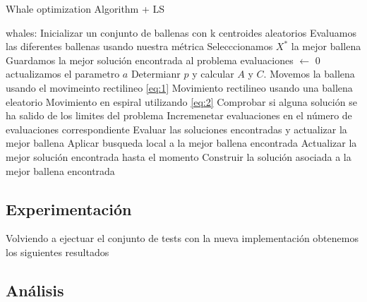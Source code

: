 \documentclass[11pt]{article}
\begin{document}
\begin{algorithm}[H]
  \caption{Whale optimization Algorithm + LS}
  \label{alg-lsearch}
  \begin{algorithmic}[1]
    \State whales: Inicializar un conjunto de ballenas con k centroides aleatorios
    \State Evaluamos las diferentes ballenas usando nuestra métrica 
    \State Selecccionamos $X^*$ la mejor ballena
    \State Guardamos la mejor solución encontrada al problema
    \State evaluaciones $\leftarrow$ 0
    \State actualizamos el parametro $a$
    \State Determianr $p$ y calcular  $A$ y $C$.
    \State Movemos la ballena usando el movimeinto rectilineo \eqref{eq:1}
    \State Movimiento rectilineo usando una ballena eleatorio
    \EndIf
    \Else
    \State Movimiento en espiral utilizando \eqref{eq:2}
    \EndIf
    \EndFor 
    \State Comprobar si alguna solución se ha salido de los limites del problema
    \State Incremenetar evaluaciones en el número de evaluaciones correspondiente
    \State Evaluar las soluciones encontradas y actualizar la mejor ballena 
    \State Aplicar busqueda local a la mejor ballena encontrada
    \State Actualizar la mejor solución encontrada hasta el momento
    \EndIf
    \EndWhile
    \State
    \Return Construir la solución asociada a la mejor ballena encontrada
    \EndProcedure
  \end{algorithmic}
\end{algorithm}

\subsection{Experimentación}

Volviendo a ejectuar el conjunto de tests con la nueva implementación obtenemos
los siguientes resultados




\subsection{Análisis}
\end{document}
